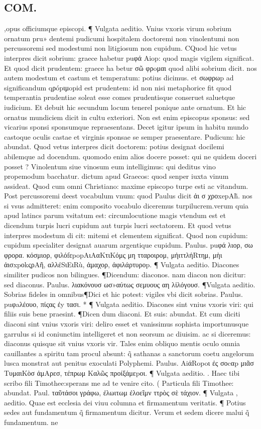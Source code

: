 \documentclass{article}
\begin{document}
\begin{pages}
\section*{COM. }
\marginpar{[ p.3 ]}\pstart ,opus officiumque episcopi. ¶ Vulgata aeditio. Vnius vxoris virum sobrium ornatum pru» dentemi pudicumi hospitalem doctoremi non vinolentumi non percussoremi sed modestumi non litigiosum non cupidum. CQuod hic vetus interpres dicit sobrium: graece habetur puφά Aiop: quod magis vigilem significat. Et quod dicit prudentem: graece ha betur σῶ φρoμαι quod alibi sobrium dicit. nos autem modestum et castum et temperatum: potius dicimus. et σωφρωp ad significandum qρópιμopid est prudentem: id non nisi metaphorice fit quod temperantia prudentiae soleat esse comes prudentisque conseruet saluetque iudicium. Et debuit hic secundum locum tenerel ponique ante ornatum. Et hic ornatus mundiciem dicit in cultu exteriori. Non est enim episcopus sponsus: sed vicarius sponsi sponsumque repraesentans. Decet igitur ipsum in habitu mundo castoque oculis castae et virginis sponsae se semper praesentare. Pudicum: hic abundat. Quod vetus interpres dicit doctorem: potius designat docilemi abilemque ad docendum. quomodo enim alios docere posset: qui ne quidem doceri posset ? Vinolentum siue vinosum eum intelligimus: qui deditus vino propemodum bacchatur. dictum apud Graecos: quod senper iuxta vinum assideat. Quod cum omni Christiano: maxime episcopo turpe esti ac vitandum. Post percussoremi deest vocabulum vnum: quod Paulus dicit ἀι σ χροxepAh̃. nos si vsus admitteret: enim composito vocabulo diceremus turpilucrem.verum quia apud latincs parum vsitatum est: circumlocutione magis vtendum est et dicendum turpis lucri cupidum aut turpis lucri sectatorem. Et quod vetus interpres modestum di cit: mitemi et clementem significat. Quod non cupidum: cupidum specialiter designat auarum argentique cupidum. Paulus. puφά λιορ, σω φρορα. κόσμιορ, φιλόfεpopAιΑαΚτιΚόμς μη τταροιρομ, μἠιττλήRτημ, μὴι ἀισxpοkςρAῆ, αλλέSιEιRù, ἀμαχορ, ἀφιλάρτυροp. ¶ Vulgata aeditio. Diacones similiter pudicos non bilingues. ¶Dicendum: diaconos. nam diacon non dicitur: sed diaconus. Paulus. λιακόνουσ ωσ»αύτως σεμυους αη λἰλόγουσ. ¶Vulgata aeditio. Sobrias fideles in omnibus¶Dici et hic potest: vigiles vbi dicit sobrias. Paulus. puφaλέουο, πίςας ἐy τασι. * ¶ Vulgata aeditio. Diacones sint vnius vxoris viri: qui filiis suis bene praesint. ¶Dicen dum diaconi. Et suis: abundat. Et cum diciti diaconi sint vnius vxoris viri: deliro esset et vanissimus sophista importunusque garrulus si id coniunctim intelligeret et non seorsum ac diuisim. ac si diceremus: diaconus quisque sit vnius vxoris vir. Tales enim obliquo mentis oculo omnia cauillantes a spiritu tam procul absunt: q̃ sathanas a sanctorum coetu angelorum lusca monstrat aut penitus exoculati Polyphemi. Paulus. AiάRopoι ἐς σοcαp μιᾶσ ΤυμαιΚὸσ ἀμAρεσ, τέπρωμ Καλῶς προίξάμεpοι. ¶ Vulgata aeditio. . Haec tibi scribo fili Timothee:sperans me ad te venire cito. ( Particula fili Timothee: abundat. Paul. ταῦτάσοι γράφω, ἐλωιτωμ ἐλοεῖμν ττρὸς σὲ τάχιον. ¶ Vulgata , aeditio. Quae est ecclesia dei viuu columna et firmamentum veritatis. ¶ Potius sedes aut fundamentum q̃ firmamentum dicitur. Verum et sedem dicere malui q̃ fundamentum. ne 
\end{pages}
\end{document}
